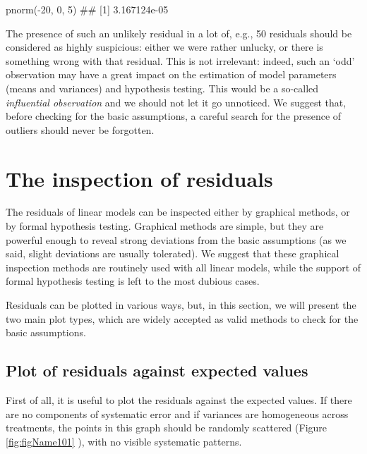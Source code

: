 \documentclass[a4paper,12pt,oneside]{book}
\newenvironment{Shaded}{\begin{snugshade}}{\end{snugshade}}
\newcommand{\DecValTok}[1]{#1}
\newcommand{\SpecialCharTok}[1]{#1}
\newcommand{\DocumentationTok}[1]{#1}
\newcommand{\FunctionTok}[1]{#1}
\newcommand{\NormalTok}[1]{#1}
\begin{document}
\begin{Shaded}
\begin{Highlighting}[]
\FunctionTok{pnorm}\NormalTok{(}\SpecialCharTok{{-}}\DecValTok{20}\NormalTok{, }\DecValTok{0}\NormalTok{, }\DecValTok{5}\NormalTok{)}
\DocumentationTok{\#\# [1] 3.167124e{-}05}
\end{Highlighting}
\end{Shaded}

The presence of such an unlikely residual in a lot of, e.g., 50 residuals should be considered as highly suspicious: either we were rather unlucky, or there is something wrong with that residual. This is not irrelevant: indeed, such an `odd' observation may have a great impact on the estimation of model parameters (means and variances) and hypothesis testing. This would be a so-called \emph{influential observation} and we should not let it go unnoticed. We suggest that, before checking for the basic assumptions, a careful search for the presence of outliers should never be forgotten.

\hypertarget{the-inspection-of-residuals}{%
\section{The inspection of residuals}\label{the-inspection-of-residuals}}

The residuals of linear models can be inspected either by graphical methods, or by formal hypothesis testing. Graphical methods are simple, but they are powerful enough to reveal strong deviations from the basic assumptions (as we said, slight deviations are usually tolerated). We suggest that these graphical inspection methods are routinely used with all linear models, while the support of formal hypothesis testing is left to the most dubious cases.

Residuals can be plotted in various ways, but, in this section, we will present the two main plot types, which are widely accepted as valid methods to check for the basic assumptions.

\hypertarget{plot-of-residuals-against-expected-values}{%
\subsection{Plot of residuals against expected values}\label{plot-of-residuals-against-expected-values}}

First of all, it is useful to plot the residuals against the expected values. If there are no components of systematic error and if variances are homogeneous across treatments, the points in this graph should be randomly scattered (Figure \ref{fig:figName101} ), with no visible systematic patterns.
\end{document}
